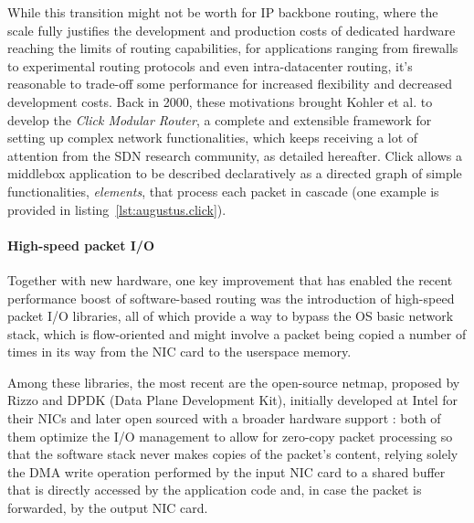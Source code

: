\documentclass[11pt,a4paper,twoside,titlepage,openany]{book}
\begin{document}

While this transition might not be worth for IP backbone routing, where the scale fully justifies the development and production costs of dedicated hardware reaching the limits of routing capabilities, for applications ranging from firewalls to experimental routing protocols and even intra-datacenter routing, it's reasonable to trade-off some performance for increased flexibility and decreased development costs.
Back in 2000, these motivations brought Kohler et al. \cite{click} to develop the \emph{Click Modular Router}, a complete and extensible framework for setting up complex network functionalities, which keeps receiving a lot of attention from the \gls{SDN} research community, as detailed hereafter. Click allows a middlebox application to be described declaratively as a directed graph of simple functionalities, \emph{elements}, that process each packet in cascade (one example is provided in listing~\ref{lst:augustus.click}).

\paragraph{High-speed packet I/O} Together with new hardware, one key improvement that has enabled the recent performance boost of software-based routing was the introduction of high-speed packet I/O libraries, all of which provide a way to bypass the OS basic network stack, which is flow-oriented and might involve a packet being copied a number of times in its way from the NIC card to the userspace memory. %

Among these libraries, the most recent are the open-source netmap, proposed by Rizzo \cite{netmap} and DPDK (Data Plane Development Kit), initially developed at Intel for their NICs and later open sourced with a broader hardware support \cite{dpdk}%
: both of them optimize the I/O management to allow for zero-copy packet processing so that the software stack never makes copies of the packet's content, relying solely the \gls{DMA} write operation performed by the input NIC card to a shared buffer that is directly accessed by the application code and, in case the packet is forwarded, by the output NIC card.
\end{document}
